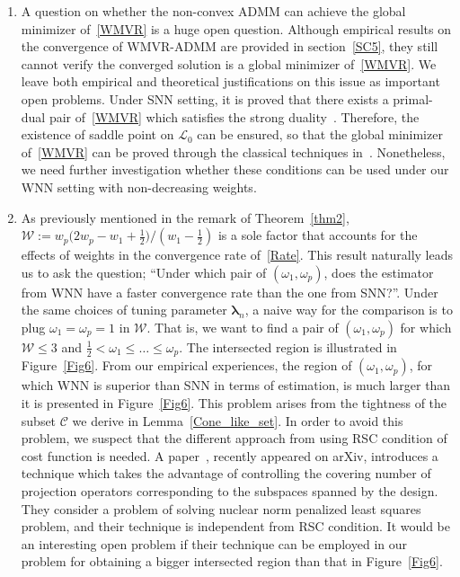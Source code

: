 \documentclass[alpha-refs]{wiley-article}
\begin{document}
\begin{enumerate}
    \item A question on whether the non-convex ADMM can achieve the global minimizer of~\eqref{WMVR} is a huge open question.
    Although empirical results on the convergence of WMVR-ADMM are provided in section~\ref{SC5}, they still cannot verify the converged solution is a global minimizer of~\eqref{WMVR}.
    We leave both empirical and theoretical justifications on this issue as important open problems.
    Under SNN setting, it is proved that there exists a primal-dual pair of~\eqref{WMVR} which satisfies the strong duality~\citep{shang2021regularization}.
    Therefore, the existence of saddle point on $\mathcal{L}_{0}$ can be ensured, so that the global minimizer of~\eqref{WMVR} can be proved through the classical techniques in~\citet{boyd2011distributed}.
    Nonetheless, we need further investigation whether these conditions can be used under our WNN setting with non-decreasing weights.

    \item As previously mentioned in the remark of Theorem~\ref{thm2}, $\mathcal{W}:= w_{p}\big(2w_{p}-w_{1}+\frac{1}{2}\big)/(w_{1}-\frac{1}{2})$ is a sole factor that accounts for the effects of weights in the convergence rate of~\eqref{Rate}.
    This result naturally leads us to ask the question; ``Under which pair of $(\omega_{1},\omega_{p})$, does the estimator from WNN have a faster convergence rate than the one from SNN?''.
    Under the same choices of tuning parameter $\boldsymbol{\lambda}_{n}$, a naive way for the comparison is to plug $\omega_{1}=\omega_{p}=1$ in $\mathcal{W}$.
    That is, we want to find a pair of $(\omega_{1},\omega_{p})$ for which $\mathcal{W} \leq 3$ and $\frac{1}{2} < \omega_{1} \leq \dots \leq \omega_{p}$.
    The intersected region is illustrated in Figure~\ref{Fig6}.
    From our empirical experiences, the region of $(\omega_{1},\omega_{p})$, for which WNN is superior than SNN in terms of estimation, is much larger than it is presented in Figure~\ref{Fig6}.
    This problem arises from the tightness of the subset $\mathcal{C}$ we derive in Lemma~\ref{Cone_like_set}.
    In order to avoid this problem, we suspect that the different approach from using RSC condition of cost function is needed.
    A paper~\citet{law2021rank}, recently appeared on arXiv, introduces a technique which takes the advantage of controlling the covering number of projection operators corresponding to the subspaces spanned by the design.
    They consider a problem of solving nuclear norm penalized least squares problem, and their technique is independent from RSC condition.
    It would be an interesting open problem if their technique can be employed in our problem for obtaining a bigger intersected region than that in Figure~\ref{Fig6}.
\end{enumerate}
\end{document}
